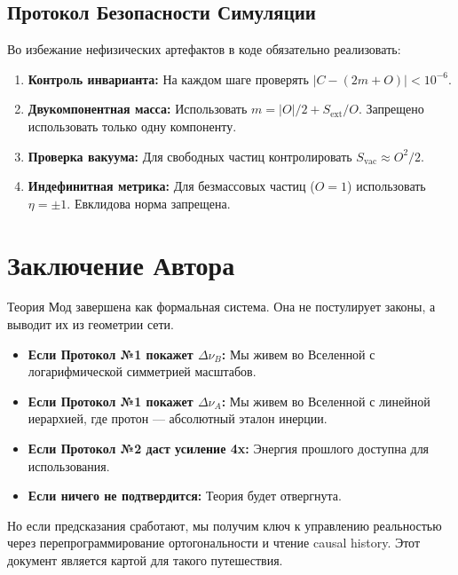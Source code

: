 \documentclass[12pt,a4paper]{article}
\begin{document}
\subsection{Протокол Безопасности Симуляции}
Во избежание нефизических артефактов в коде обязательно реализовать:
\begin{enumerate}
    \item \textbf{Контроль инварианта:} На каждом шаге проверять $|C - (2m + O)| < 10^{-6}$.
    \item \textbf{Двукомпонентная масса:} Использовать $m = |O|/2 + S_{\text{ext}}/O$. Запрещено использовать только одну компоненту.
    \item \textbf{Проверка вакуума:} Для свободных частиц контролировать $S_{\text{vac}} \approx O^2/2$.
    \item \textbf{Индефинитная метрика:} Для безмассовых частиц ($O=1$) использовать $\eta = \pm 1$. Евклидова норма запрещена.
\end{enumerate}

\section*{Заключение Автора}

Теория Мод завершена как формальная система. Она не постулирует законы, а выводит их из геометрии сети.
\begin{itemize}
    \item \textbf{Если Протокол №1 покажет $\Delta \nu_B$:} Мы живем во Вселенной с логарифмической симметрией масштабов.
    \item \textbf{Если Протокол №1 покажет $\Delta \nu_A$:} Мы живем во Вселенной с линейной иерархией, где протон — абсолютный эталон инерции.
    \item \textbf{Если Протокол №2 даст усиление 4x:} Энергия прошлого доступна для использования.
    \item \textbf{Если ничего не подтвердится:} Теория будет отвергнута.
\end{itemize}

Но если предсказания сработают, мы получим ключ к управлению реальностью через перепрограммирование ортогональности и чтение causal history. Этот документ является картой для такого путешествия.
\end{document}
